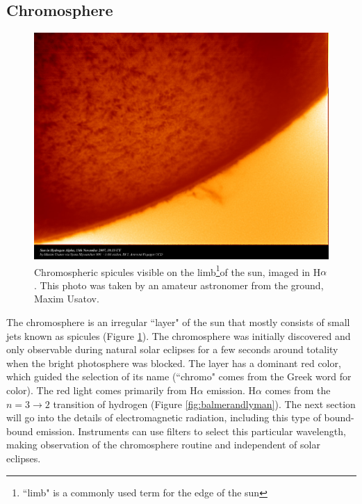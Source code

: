 \subsection{Chromosphere}

\begin{figure}[!h]
    \begin{center}
	    \includegraphics[width=120mm]{Images/Spicules.png}
    \end{center}
    \caption[Spicules of the Chromosphere]{
        Chromospheric spicules visible on the limb\footnote{``limb" is a commonly used term for the edge
        of the sun}of the sun, imaged in H$\alpha$. This photo was taken by an amateur astronomer from the ground, 
        Maxim Usatov. 
    }
    \label{fig:spicules}
\end{figure}

The chromosphere is an irregular ``layer" of the sun that mostly consists of small jets known as spicules (Figure \ref{fig:spicules}). The chromosphere was initially discovered and only observable during natural solar eclipses for a few seconds around totality when the bright photosphere was blocked. The layer has a dominant red color, which guided the selection of its name (``chromo" comes from the Greek word for color). The red light comes primarily from H$\alpha$ emission. H$\alpha$ comes from the $n = 3\rightarrow 2$ transition of hydrogen (Figure \ref{fig:balmerandlyman}). The next section will go into the details of electromagnetic radiation, including this type of bound-bound emission. Instruments can use filters to select this particular wavelength, making observation of the chromosphere routine and independent of solar eclipses. 

